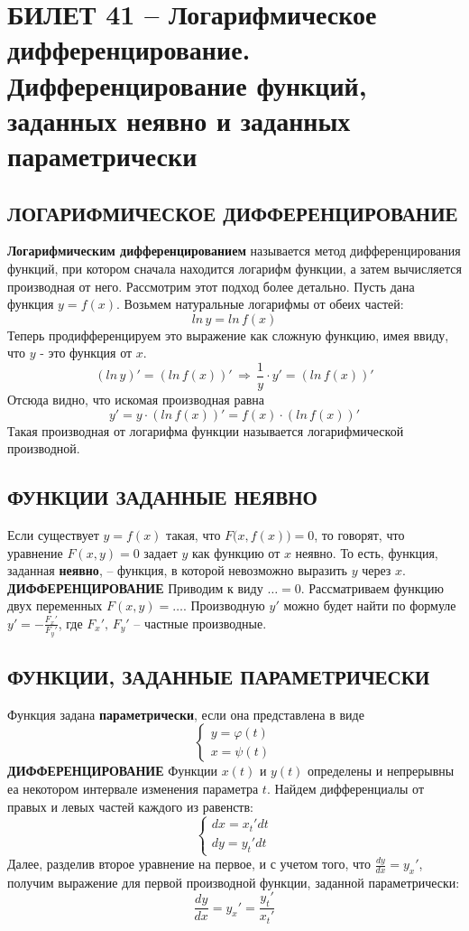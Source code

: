 \documentclass{article}
\begin{document}
\section{БИЛЕТ 41 -- Логарифмическое дифференцирование. Дифференцирование функций, заданных неявно и заданных параметрически}
\subsection{ЛОГАРИФМИЧЕСКОЕ ДИФФЕРЕНЦИРОВАНИЕ}
\textbf{Логарифмическим дифференцированием} называется метод дифференцирования функций, при котором сначала находится логарифм функции, а затем вычисляется производная от него. 
\newline
Рассмотрим этот подход более детально. Пусть дана функция $y=f(x)$. Возьмем натуральные логарифмы от обеих частей:
$$ ln\,y=ln\,f(x)$$
Теперь продифференцируем это выражение как сложную функцию, имея ввиду, что $y$ - это функция от $x$.
$$ (ln\,y)'=(ln\,f(x))'\,\Rightarrow\,\frac{1}{y}\cdot y'=(ln\,f(x))' $$
Отсюда видно, что искомая производная равна
$$ y'=y\cdot(ln\,f(x))'=f(x)\cdot(ln\,f(x))' $$
Такая производная от логарифма функции называется логарифмической производной. 
\subsection{ФУНКЦИИ ЗАДАННЫЕ НЕЯВНО}
Если существует $y=f(x)$ такая, что $F\big(x,f(x)\big)=0$, то говорят, что уравнение $F(x,y)=0$ задает $y$ как функцию от $x$ неявно. То есть, функция, заданная \textbf{неявно}, -- функция, в которой невозможно выразить $y$ через $x$.
\newline
\newline
\textbf{ДИФФЕРЕНЦИРОВАНИЕ} Приводим к виду $\ldots=0$. Рассматриваем функцию двух переменных $F(x,y)=\ldots$. Производную $y'$ можно будет найти по формуле $y'=-\frac{F_x'}{F_y'}$, где $F_x',\,F_y'$ -- частные производные.
\newpage
\subsection{ФУНКЦИИ, ЗАДАННЫЕ ПАРАМЕТРИЧЕСКИ}
Функция задана \textbf{параметрически}, если она представлена в виде
$$ \begin{cases}y=\varphi(t)\\x=\psi(t) \end{cases}$$
\textbf{ДИФФЕРЕНЦИРОВАНИЕ} Функции $x(t)$ и $y(t)$ определены и непрерывны еа некотором интервале изменения параметра $t$. Найдем дифференциалы от правых и левых частей каждого из равенств:
$$ \begin{cases} dx=x_t'dt\\dy=y_t'dt \end{cases} $$
\newline
Далее, разделив второе уравнение на первое, и с учетом того, что $\frac{dy}{dx}=y_x' $, получим выражение для первой производной функции, заданной параметрически:
$$ \frac{dy}{dx}=y_x'=\frac{y_t'}{x_t'} $$
\newpage
\end{document}
